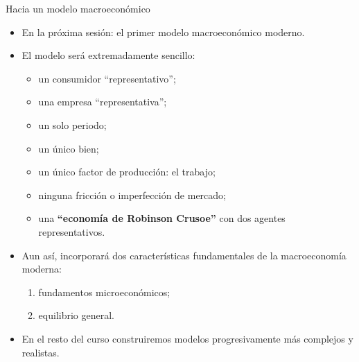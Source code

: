 \documentclass[aspectratio=169,11pt]{beamer}
\newif\ifusarBibliografia
\begin{document}
\begin{frame}{Hacia un modelo macroeconómico}

  \small

  \begin{itemize}
    \setlength{\itemsep}{0.35em}

    \item En la próxima sesión: el primer modelo macroeconómico moderno.

    \item El modelo será extremadamente sencillo:
    \begin{itemize}
      \setlength{\itemsep}{0.15em}
      \item un consumidor ``representativo'';
      \item una empresa ``representativa'';
      \item un solo periodo;
      \item un único bien;
      \item un único factor de producción: el trabajo;
      \item ninguna fricción o imperfección de mercado;
      \item una \alert{\textbf{``economía de Robinson Crusoe''}} con dos agentes representativos.
    \end{itemize}

    \item Aun así, incorporará dos características fundamentales de la
    macroeconomía moderna:
    \begin{enumerate}
      \setlength{\itemsep}{0.1em}
      \item fundamentos microeconómicos;
      \item equilibrio general.
    \end{enumerate}

    \item En el resto del curso construiremos modelos progresivamente más
    complejos y realistas.

  \end{itemize}

\end{frame}
%
\end{document}
